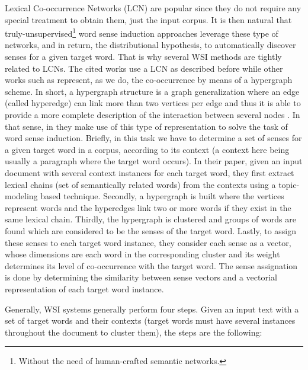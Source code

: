 Lexical Co-occurrence Networks (LCN) are  popular  since they do not require any special treatment to obtain them, just the input corpus. It is then natural that truly-unsupervised\footnote{Without the need of human-crafted semantic networks.} word sense induction approaches leverage these type of networks, and in return, the distributional hypothesis, to automatically discover senses for a given target word. That is why several WSI methods \cite{2004.Veronis,2007.Klapaftis.UOY,2010.Navigli.InducingWordSenses.Triangles,2008.Klapaftis.WSIUsingCollocations,2011.DiMarco.Navigli.ClusteringWebSearch,2011.Jurgens.WSICommunityDetection} are tightly related to LCNs. 
The cited works use a LCN as described before while other works such as \cite{2007.Navigli.GraphConnectivity,2014.Tao.Qian.LexicalChainHypergraphWSI} represent, as we do, the co-occurrence by means of a hypergraph scheme. In short, a hypergraph structure is a graph generalization where an edge (called hyperedge) can link more than two vertices per edge and thus it is able to provide a more complete description of the interaction between several nodes \cite{estrada2005}. In that sense, in  \cite{2014.Tao.Qian.LexicalChainHypergraphWSI} they make use of this type of representation to solve the task of word sense induction. Briefly, in this task we have to determine a set of senses for a given target word in a corpus, according to its context (a context here being usually a paragraph where the target word occurs). In their paper, given an input document with several context instances for each target word, they first extract lexical chains (set of semantically related words) from the contexts using a topic-modeling based technique. Secondly, a hypergraph is built where the vertices represent words and the hyperedges link two or more words if they exist in the same lexical chain. Thirdly, the hypergraph is clustered and groups of words are found which are considered to be the senses of the target word. Lastly, to assign these senses to each target word instance, they consider each sense as a vector, whose dimensions are each word in the corresponding cluster and its weight determines its level of co-occurrence  with the target word. The sense assignation is done by determining the similarity between sense vectors and a vectorial representation of each target word instance.

Generally, WSI systems generally perform four steps. Given an input text with a set of target words and their contexts (target words must have several instances throughout the document to cluster them), the steps are the following:

